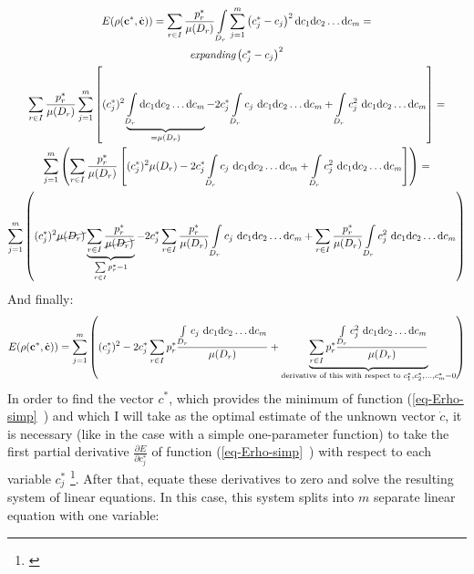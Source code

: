 \begin{gather}
\nonumber
E(\rho(\textbf{c}^{*},\dot{\textbf{c}}))=\sum\limits_{r \in I} \frac{p_{r}^{*}}{\mu(D_{r})} \int\limits_{D_{r}}\sum\limits_{j=1}^{m} \left( c_{j}^{*}-c_{j} \right)^{2}\mathrm{d}c_{1}\mathrm{d}c_{2}\dots \mathrm{d}c_{m} = \\
\nonumber
\textit{expanding} \left( c_{j}^{*}-c_{j} \right)^{2} \\
\nonumber
\sum\limits_{r \in I} \frac{p_{r}^{*}}{\mu(D_{r})} \sum\limits_{j=1}^{m} \left[ (c_{j}^{*})^{2} \underbrace{\int\limits_{D_{r}} \mathrm{d}c_{1}\mathrm{d}c_{2}\dots \mathrm{d}c_{m}}_{{=\mu(D_{r})}} - 2c_{j}^{*} \int\limits_{D_{r}} c_{j} \  \mathrm{d}c_{1}\mathrm{d}c_{2}\dots \mathrm{d}c_{m} + \int\limits_{D_{r}} c_{j}^{2} \  \mathrm{d}c_{1}\mathrm{d}c_{2}\dots \mathrm{d}c_{m}\right]= \\
\nonumber
\sum\limits_{j=1}^{m} \left( \sum\limits_{r \in I} \frac{p_{r}^{*}}{\mu(D_{r})} \left[ (c_{j}^{*})^{2} \mu(D_{r})-2c_{j}^{*} \int\limits_{D_{r}} c_{j} \  \mathrm{d}c_{1}\mathrm{d}c_{2}\dots \mathrm{d}c_{m} + \int\limits_{D_{r}} c_{j}^{2} \  \mathrm{d}c_{1}\mathrm{d}c_{2}\dots \mathrm{d}c_{m} \right] \right) = \\ 
\sum\limits_{j=1}^{m} \left( (c_{j}^{*})^{2} \cancel{\mu(D_{r})} \underbrace{\sum\limits_{r \in I} \frac{p_{r}^{*}}{\cancel{\mu(D_{r})}}}_{\sum\limits_{r \in I}p_{r}^{*} = 1} - 2c_{j}^{*} \sum\limits_{r \in I}\frac{p_{r}^{*}}{\mu(D_{r})} \int\limits_{D_{r}} c_{j} \  \mathrm{d}c_{1}\mathrm{d}c_{2}\dots \mathrm{d}c_{m} + \sum\limits_{r \in I}\frac{p_{r}^{*}}{\mu(D_{r})} \int\limits_{D_{r}} c_{j}^{2} \  \mathrm{d}c_{1}\mathrm{d}c_{2}\dots \mathrm{d}c_{m} \right)
\end{gather}
And finally:
\begin{equation}
E(\rho(\textbf{c}^{*},\dot{\textbf{c}}))= \sum\limits_{j=1}^{m} \left( (c_{j}^{*})^{2} - 2c_{j}^{*} \sum\limits_{r \in I} p_{r}^{*} \frac{\int\limits_{D_{r}} c_{j} \  \mathrm{d}c_{1}\mathrm{d}c_{2}\dots \mathrm{d}c_{m}}{\mu(D_{r})} + \underbrace{\sum\limits_{r \in I} p_{r}^{*} \frac{\int\limits_{D_{r}} c_{j}^{2} \  \mathrm{d}c_{1}\mathrm{d}c_{2}\dots \mathrm{d}c_{m}}{\mu(D_{r})}}_{\text{derivative of this with respect to } c_{1}^{*}, c_{2}^{*},\dots,c_{m}^{*} = 0} \right) \label{eq-Erho-simp}
\end{equation}
In order to find the vector $c^{*}$, which provides the minimum of function (\vref{eq-Erho-simp}~) and which I will take as the optimal estimate of the unknown vector $\dot{c}$, it is necessary (like in the case with a simple one-parameter function) to take the first partial derivative $\frac{\partial E}{\partial c_{j}^{*}}$ of function (\vref{eq-Erho-simp}~) with respect to each variable $c_{j}^{*}$ \footnote{\cite{stewart_2008_deriv}}. After that, equate these derivatives to zero and solve the resulting system of linear equations. In this case, this system splits into $m$ separate linear equation with one variable:
